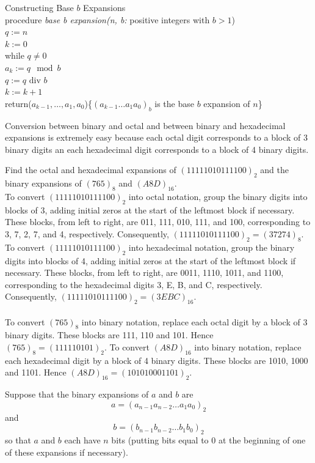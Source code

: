 \documentclass[12pt]{article}
\begin{document}
\begin{alg} Constructing Base $b$ Expansions \\ procedure \textit{base b expansion(n, b:} positive integers with $b > 1$) \\ $q := n$ \\ $k:= 0$ \\ while $q \neq 0$ \\ \indent $a_k := q \mod b$ \\ \indent $q:= q \text{ div } b$ \\ \indent $k:= k + 1$ \\ return($a_{k - 1}, \dots, a_1, a_0$)\{$(a_{k - 1} \dots a_1a_0)_b$ is the base $b$ expansion of $n$\} \end{alg}
Conversion between binary and octal and between binary and hexadecimal expansions is extremely easy because each octal digit corresponds to a block of 3 binary digits an each hexadecimal digit corresponds to a block of 4 binary digits. 
\begin{example} Find the octal and hexadecimal expansions of $(11111010111100)_2$ and the binary expansions of $(765)_8$ and $(A8D)_{16}$. \\ To convert $(11111010111100)_2$ into octal notation, group the binary digits into blocks of 3, adding initial zeros at the start of the leftmost block if necessary. These blocks, from left to right, are 011, 111, 010, 111, and 100, corresponding to 3, 7, 2, 7, and 4, respectively. Consequently, $(11111010111100)_2 = (37274)_8$. To convert $(11111010111100)_2$ into hexadecimal notation, group the binary digits into blocks of 4, adding initial zeros at the start of the leftmost block if necessary. These blocks, from left to right, are 0011, 1110, 1011, and 1100, corresponding to the hexadecimal digits 3, E, B, and C, respectively. Consequently, $(11111010111100)_2 = (3EBC)_{16}$. \\~\\
To convert $(765)_8$ into binary notation, replace each octal digit by a block of 3 binary digits. These blocks are 111, 110 and 101. Hence $(765)_8 = (111110101)_2$. To convert $(A8D)_{16}$ into binary notation, replace each hexadecimal digit by a block of 4 binary digits. These blocks are 1010, 1000 and 1101. Hence $(A8D)_{16} = (101010001101)_2$. \end{example} 
Suppose that the binary expansions of $a$ and $b$ are $$a = (a_{n - 1}a_{n - 2}\dots a_1a_0)_2$$ and $$b = (b_{n - 1}b_{n -2}\dots b_1b_0)_2$$ so that $a$ and $b$ each have $n$ bits (putting bits equal to 0 at the beginning of one of these expansions if necessary). 
\end{document}
